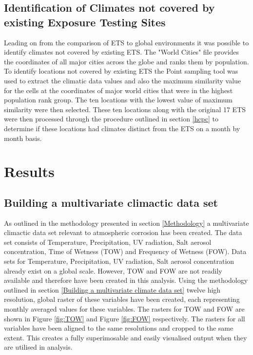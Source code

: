 \documentclass{article}
\begin{document}
\subsection{Identification of Climates not covered by existing Exposure Testing Sites}\label{notcovered}
Leading on from the comparison of ETS to global environments it was possible to identify climates not covered by existing ETS. The "World Cities" \citep{World Cities} file provides the coordinates of all major cities across the globe and ranks them by population. To identify locations not covered by existing ETS the Point sampling tool \citep{} was used to extract the climatic data values and also the maximum similarity value for the cells at the coordinates of major world cities that were in the highest population rank group. The ten locations with the lowest value of maximum similarity were then selected. These ten locations along with the original 17 ETS were then processed through the procedure outlined in section \ref{hcpc} to determine if these locations had climates distinct from the ETS on a month by month basis.   


\section{Results}

\subsection{Building a multivariate climactic data set}
As outlined in the methodology presented in section \ref{Methodology} a multivariate climactic data set relevant to atmospheric corrosion has been created. The data set consists of Temperature, Precipitation, UV radiation, Salt aerosol concentration, Time of Wetness (TOW) and Frequency of Wetness (FOW). Data sets for Temperature, Precipitation, UV radiation, Salt aerosol concentration already exist on a global scale. However, TOW and FOW are not readily available and therefore have been created in this analysis. Using the methodology outlined in section \ref{Building a multivariate climate data set} twelve high resolution, global raster of these variables have been created, each representing monthly averaged values for these variables. The rasters for TOW and FOW are shown in Figure \ref{fig:TOW} and Figure \ref{fig:FOW} respectively. The rasters for all variables have been aligned to the same resolutions and cropped to the same extent. This creates a fully superimosable and easily visualised output when they are utilised in analysis.
\end{document}
